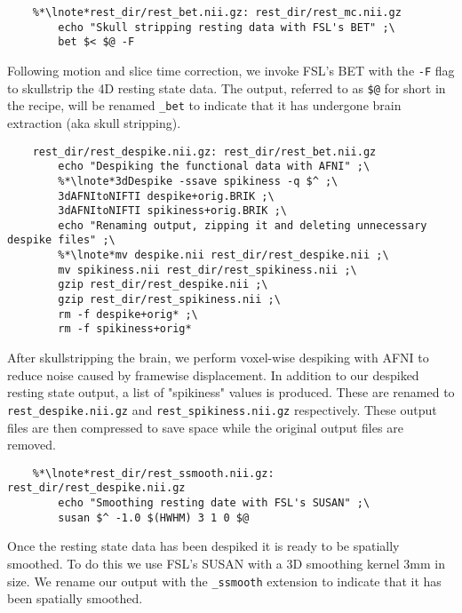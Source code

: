 \begin{lstlisting}
	%*\lnote*rest_dir/rest_bet.nii.gz: rest_dir/rest_mc.nii.gz
		echo "Skull stripping resting data with FSL's BET" ;\
		bet $< $@ -F
\end{lstlisting}

 Following motion and slice time correction, we invoke FSL's BET with the \texttt{-F} flag to skullstrip the 4D resting state data. The output, referred to as \texttt{\$@} for short in the recipe, will be renamed  \texttt{_bet} to indicate that it has undergone brain extraction (aka skull stripping).

\begin{lstlisting}
	rest_dir/rest_despike.nii.gz: rest_dir/rest_bet.nii.gz
		echo "Despiking the functional data with AFNI" ;\
		%*\lnote*3dDespike -ssave spikiness -q $^ ;\
		3dAFNItoNIFTI despike+orig.BRIK ;\
		3dAFNItoNIFTI spikiness+orig.BRIK ;\
		echo "Renaming output, zipping it and deleting unnecessary despike files" ;\
		%*\lnote*mv despike.nii rest_dir/rest_despike.nii ;\
		mv spikiness.nii rest_dir/rest_spikiness.nii ;\
		gzip rest_dir/rest_despike.nii ;\
		gzip rest_dir/rest_spikiness.nii ;\
		rm -f despike+orig* ;\
		rm -f spikiness+orig*
\end{lstlisting}

\lnum{8} After skullstripping the brain, we perform voxel-wise despiking with AFNI to reduce noise caused by framewise displacement.  In addition to our despiked resting state output, a list of "spikiness" values is produced. These are renamed to \texttt{rest_despike.nii.gz} and \texttt{rest_spikiness.nii.gz} respectively. These output files are then compressed to save space while the original output files are removed.

\begin{lstlisting}
	%*\lnote*rest_dir/rest_ssmooth.nii.gz: rest_dir/rest_despike.nii.gz
		echo "Smoothing resting date with FSL's SUSAN" ;\
		susan $^ -1.0 $(HWHM) 3 1 0 $@
\end{lstlisting}

\lnum{10} Once the resting state data has been despiked it is ready to be spatially smoothed. To do this we use FSL's SUSAN with a 3D smoothing kernel 3mm in size. We rename our output with the  \texttt{_ssmooth} extension to indicate that it has been spatially smoothed.

